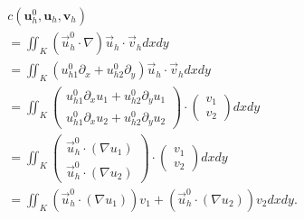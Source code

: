 \documentclass{ctexart}
\begin{document}
\begin{align*}
    & c(\mathbf{u}_h^{0}, \mathbf{u}_h, \mathbf{v}_h)\\ 
    & = \iint_K(\vec{u} _h^0 \cdot \nabla) \vec{u}_h\cdot \vec{v}_hdxdy\\ 
    & = \iint_K(u_{h1}^0 \partial_x + u_{h2}^0 \partial_y) \vec{u}_h \cdot \vec{v}_h dxdy\\
    & = \iint_K \begin{pmatrix}
     u_{h1}^0\partial _xu_1 + u_{h2}^0\partial _yu_1 \\
     u_{h1}^0\partial _xu_2 + u_{h2}^0\partial _yu_2
    \end{pmatrix}
    \cdot \begin{pmatrix}
     v_1\\
    v_2
    \end{pmatrix}dxdy\\
    & = \iint_K \begin{pmatrix}
     \vec{u}_h^0 \cdot (\nabla u_1) \\
     \vec{u}_h^0 \cdot (\nabla u_2)
    \end{pmatrix}
    \cdot \begin{pmatrix}
     v_1\\
    v_2
    \end{pmatrix}dxdy\\
    & = \iint_K (\vec{u}_h^0 \cdot (\nabla u_1)) v_1 + (\vec{u}_h^0 \cdot (\nabla u_2)) v_2dxdy.
\end{align*}
\end{document}

